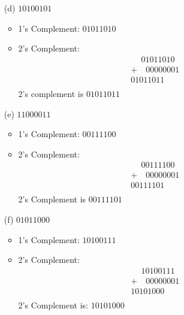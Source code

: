 \documentclass{article}
\begin{document}
\begin{enumerate}
    \item[(d)] \(10100101\)
        \begin{itemize}
            \item 1’s Complement: \(01011010\)
            \item 2's Complement:
                  \[
                  \begin{array}{r}
                    \phantom{+}01011010 \\
                    +\quad 00000001 \\
                    \hline
                    01011011 \\
                  \end{array}
                  \]
            2’s complement is \(01011011\)
        \end{itemize}

    \item[(e)] \(11000011\)
        \begin{itemize}
            \item 1’s Complement: \(00111100\)
            \item 2's Complement:
                  \[
                  \begin{array}{r}
                    \phantom{+}00111100 \\
                    +\quad 00000001 \\
                    \hline
                    00111101 \\
                  \end{array}
                  \]
            2’s Complement is \(00111101\)
        \end{itemize}

    \item[(f)] \(01011000\)
        \begin{itemize}
            \item 1’s Complement: \(10100111\)
            \item 2's Complement:
                  \[
                  \begin{array}{r}
                    \phantom{+}10100111 \\
                    +\quad 00000001 \\
                    \hline
                    10101000 \\
                  \end{array}
                  \]
            2’s Complement is: \(10101000\)
        \end{itemize}
\end{enumerate}
\end{document}
